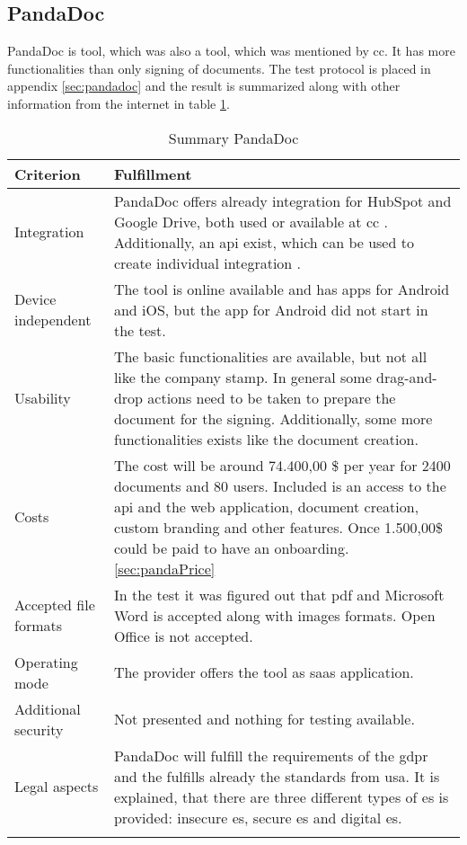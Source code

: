\subsection{PandaDoc}
PandaDoc is tool, which was also a tool, which was mentioned by \gls{cc}. It has more functionalities than only signing of documents. The test protocol is placed in appendix \ref{sec:pandadoc} and the result is summarized along with other information from the internet in table \ref{tab:pandadoc}. 
	\begin{longtable}{|p{4cm}|p{10cm}|} \hline
		Criterion & Fulfillment \\ \hline
		Integration & PandaDoc offers already integration for HubSpot and Google Drive, both used or available at \gls{cc} \parencite{pandadoc2018integration}. Additionally, an \gls{api} exist, which can be used to create individual integration \parencite{pandadoc2018api}. \\ \hline
		Device independent & The tool is online available and has \glspl{app} for Android and iOS, but the \gls{app} for Android did not start in the test. \\ \hline
		Usability & The basic functionalities are available, but not all like the company stamp. In general some drag-and-drop actions need to be taken to prepare the document for the signing. Additionally, some more functionalities exists like the document creation.\\ \hline
		Costs & The cost will be around 74.400,00 \$ per year for 2400 documents and 80 users. Included is an access to the \gls{api} and the web application, document creation, custom branding and other features. Once 1.500,00\$ could be paid to have an onboarding.  \ref{sec:pandaPrice} \\ \hline
		Accepted file formats & In the test it was figured out that \gls{pdf} and Microsoft Word is accepted along with images formats. Open Office is not accepted. \\ \hline
		Operating mode & The provider offers the tool as \gls{saas} application. \parencite{pandadoc2018saas} \\ \hline
		Additional security & Not presented and nothing for testing available. \\ \hline
		Legal aspects & PandaDoc will fulfill the requirements of the \gls{gdpr} and the fulfills already the standards from \gls{usa}. It is explained, that there are three different types of \gls{es} is provided: insecure \gls{es}, secure \gls{es} and digital \gls{es}.  \parencite{pandadoc2018gdpr,pandadoc2018legal} \\ \hline
	\caption{Summary PandaDoc}
	\label{tab:pandadoc}
	\end{longtable}

